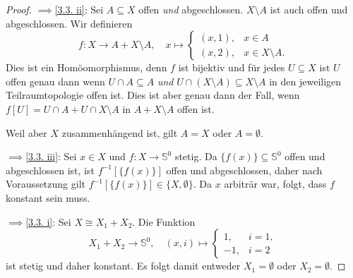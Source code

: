 \documentclass[
12pt, 
openany, 
a4paper, 
final,
fleqn, 
]{myclass}
\numberwithin{equation}{chapter}
\numberwithin{section}{chapter}
\newcommand{\Ss}{\mathbb S}
\newcommand{\implication}[2]{\glqq {#1}$\implies${#2}\grqq}
\begin{document}
\begin{proof}
\implication{\ref{3.3. i}}{\ref{3.3. ii}}: Sei $A\subseteq X$ offen \emph{und} abgeschlossen. $X\setminus A$ ist auch offen und abgeschlossen. Wir definieren 
\[
f: X\to A + X\setminus A, \quad x\mapsto 
\begin{cases}
(x, 1), & x\in A\\
(x, 2), & x\in X\setminus A. 
\end{cases}
\]
Dies ist ein Homöomorphismus, denn $f$ ist bijektiv und für jedes $U\subseteq X$ ist $U$ offen genau dann wenn $U\cap A\subseteq A$ \emph{und} $U\cap(X\setminus A)\subseteq X\setminus A$ in den jeweiligen Teilraumtopologie offen ist. Dies ist aber genau dann der Fall, wenn $f[U] = U \cap A + U \cap X\setminus A$ in $A + X\setminus A$ offen ist. 

Weil aber $X$ zusammenhängend ist, gilt $A=X$ oder $A=\emptyset$. 

\implication{\ref{3.3. ii}}{\ref{3.3. iii}}: Sei $x\in X$ und $f: X\to \Ss^0$ stetig. Da $\{f(x) \}\subseteq \Ss^0$ offen und abgeschlossen ist, ist $f^{-1}[\{f(x)\}]$ offen und abgeschlossen, daher nach Voraussetzung gilt $f^{-1}[\{f(x)\}] \in \{X, \emptyset\}$. Da $x$ arbiträr war, folgt, dass $f$ konstant sein muss. 

\implication{\ref{3.3. iii}}{\ref{3.3. i}}: Sei $X\cong X_1 + X_2$. Die Funktion 
\[
X_1 + X_2 \to \Ss^0, \quad (x, i) \mapsto \begin{cases}
1, & i=1,\\
-1, & i=2
\end{cases}
\]
ist stetig und daher konstant. Es folgt damit entweder $X_1 = \emptyset$ oder $X_2 = \emptyset$. 
\end{proof}
\end{document}
